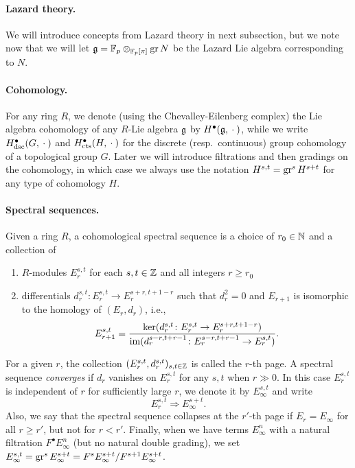\paragraph{Lazard theory.} We will introduce concepts from Lazard theory in next subsection, but we note now that we will let $\mathfrak{g} = \mathbb{F}_p \otimes_{\mathbb{F}_p[\pi]} \operatorname{gr} N$ be the Lazard Lie algebra corresponding to $N$.

\paragraph{Cohomology.} For any ring $R$, we denote (using the Chevalley-Eilenberg complex) the Lie algebra cohomology of any $R$-Lie algebra $\mathfrak{g}$ by $H^{\bullet}(\mathfrak{g}, \:\cdot\:)$, while we write $H_{\mathrm{dsc}}^{\bullet}(G, \:\cdot\:)$ and $H_{\mathrm{cts}}^{\bullet}(H, \:\cdot\:)$ for the discrete (resp.\ continuous) group cohomology of a topological group $G$. Later we will introduce filtrations and then gradings on the cohomology, in which case we always use the notation $H^{s,t} = \operatorname{gr}^{s}H^{s+t}$ for any type of cohomology $H$.

\paragraph{Spectral sequences.} Given a ring $R$, a cohomological spectral sequence is a choice of $r_0 \in \mathbb{N}$ and a collection of
\begin{enumerate}[$\bullet$]
  \item $R$-modules $E_r^{s,t}$ for each $s,t \in \mathbb{Z}$ and all integers $r \geq r_0$
  \item differentials $d_r^{s,t} \colon E_r^{s,t} \to E_r^{s+r,t+1-r}$ such that $d_r^2 = 0$ and $E_{r+1}$ is isomorphic to the homology of $(E_r,d_r)$, i.e.,
  \[
    E_{r+1}^{s,t} = \frac{\operatorname{ker}(d_r^{s,t} \colon E_r^{s,t} \to E_r^{s+r,t+1-r})}{\operatorname{im}(d_r^{s-r,t+r-1} \colon E_r^{s-r,t+r-1} \to E_r^{s,t})}.
  \]
\end{enumerate}
For a given $r$, the collection $(E_r^{s,t},d_r^{s,t})_{s,t\in\mathbb{Z}}$ is called the $r$-th page. A spectral sequence \emph{converges} if $d_r$ vanishes on $E_r^{s,t}$ for any $s,t$ when $r\gg0$. In this case $E_r^{s,t}$ is independent of $r$ for sufficiently large $r$, we denote it by $E_{\infty}^{s,t}$ and write
  \[
    E_{r}^{s,t} \Longrightarrow E_\infty^{s+t}.
  \]
Also, we say that the spectral sequence collapses at the $r'$-th page if $E_{r} = E_{\infty}$ for all $r \geq r'$, but not for $r < r'$. Finally, when we have terms $E_\infty^{n}$  with a natural filtration $F^\bullet E_\infty^n$ (but no natural double grading), we set $E_\infty^{s,t} = \operatorname{gr}^{s} E_\infty^{s+t}= F^{s}E_\infty^{s+t}/F^{s+1}E_\infty^{s+t}$.



